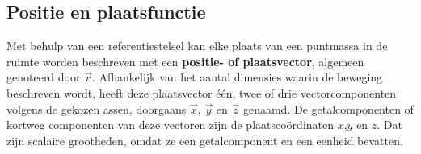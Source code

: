 \documentclass{ximera}
\begin{document}
	\author{Bart Lambregs, Vincent Gellens}
    \xmsource\xmuitleg




\subsection*{Positie en plaatsfunctie}

Met behulp van een referentiestelsel kan elke plaats van een puntmassa in de ruimte worden beschreven met een \textbf{positie- of plaatsvector}, algemeen genoteerd door $\vec{r}$. Afhankelijk van het aantal dimensies waarin de beweging beschreven wordt, heeft deze plaatsvector één, twee of drie vectorcomponenten volgens de gekozen assen, doorgaans \(\vec{x}\), \(\vec{y}\) en \(\vec{z}\) genaamd. De getalcomponenten of kortweg componenten van deze vectoren zijn de plaatscoördinaten \(x\),\(y\) en \(z\). Dat zijn scalaire grootheden, omdat ze een getalcomponent en een eenheid bevatten.
\end{document}
